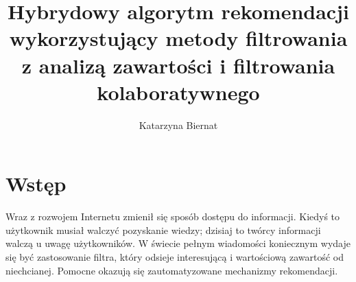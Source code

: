 \documentclass[twoside]{iisthesis}
\newcommand{\myfigure}[1]{%
\addcontentsline{figu}{myfigure}{\protect\numberline{\thefigure}#1}\par}
\begin{document}
\newcommand{\resultChart}[7][140]{
\def\dataS{{#2}}
	\begin{figure}[H]
	
\centering

\begin{center}
\begin{tikzpicture}
 
\begin{axis}[
ybar,
bar width=20,
legend style={at={(0.5,-0.25)},
anchor=north,legend columns=-1},
ylabel={Wartość miary},
symbolic x coords={\dataS},
xtick=data,
height=  {#1},
width=0.8\textwidth,
ymin=0, ytick={0,0.5,1},
ymax=1.5,
nodes near coords,
nodes near coords align={vertical},
]
\addplot coordinates { (\dataS,{#3}) };
\addplot coordinates {(\dataS,{#4}) };
\addplot coordinates { (\dataS,{#5}) };
\legend{Recall,Precission,F1-Score}
\end{axis}
\end{tikzpicture}
\end{center}
\caption{{#6}}
\myfigure{{#6}}
\label{{#7}}
\end{figure}
}


%
\nocite{*}
\title{ Hybrydowy algorytm rekomendacji wykorzystujący metody filtrowania z analizą zawartości i filtrowania kolaboratywnego }
\author{Katarzyna Biernat }

\date{\number\the\year}




\maketitle
\textpages


\graphicspath{ {img/} }

 \chapter{Wstęp}
	 Wraz z rozwojem Internetu zmienił się sposób dostępu do informacji. Kiedyś to użytkownik musiał walczyć pozyskanie wiedzy; dzisiaj to twórcy informacji walczą u uwagę użytkowników. W świecie pełnym wiadomości koniecznym wydaje się być zastosowanie filtra, który odsieje interesującą  i wartościową zawartość od niechcianej. Pomocne okazują się zautomatyzowane mechanizmy rekomendacji.
	 
\end{document}
